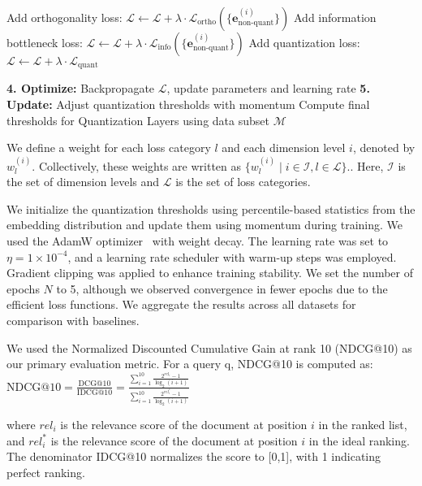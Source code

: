 \begin{algorithm}[H]
\begin{algorithmic}[1]
        \State Add orthogonality loss: $\mathcal{L} \leftarrow \mathcal{L} + \lambda \cdot \mathcal{L}_{\text{ortho}}(\{\mathbf{e}_{\text{non-quant}}^{(i)}\})$
        \State Add information bottleneck loss: $\mathcal{L} \leftarrow \mathcal{L} + \lambda \cdot \mathcal{L}_{\text{info}}(\{\mathbf{e}_{\text{non-quant}}^{(i)}\})$
        \State Add quantization loss: $\mathcal{L} \leftarrow \mathcal{L} + \lambda \cdot \mathcal{L}_{\text{quant}}$
        
        \State \textbf{4. Optimize:} Backpropagate $\mathcal{L}$, update parameters and learning rate
        \State \textbf{5. Update:} Adjust quantization thresholds with momentum
    \EndFor
\EndFor
\State Compute final thresholds for Quantization Layers using data subset
\State \Return $\mathcal{M}$
\end{algorithmic}
\end{algorithm}

We define a weight for each loss category \(l\) and each dimension level \(i\), denoted by \(w_l^{(i)}\). Collectively, these weights are written as $\{ w_l^{(i)} \mid i \in \mathcal{I}, l \in \mathcal{L} \}.$.
Here, \(\mathcal{I}\) is the set of dimension levels and \(\mathcal{L}\) is the set of loss categories.

We initialize the quantization thresholds using percentile-based statistics from the embedding distribution and update them using momentum during training.
We used the AdamW optimizer~\cite{loshchilov2017decoupled} with weight decay. The learning rate was set to $\eta = 1 \times 10^{-4}$, and a learning rate scheduler with warm-up steps was employed. Gradient clipping was applied to enhance training stability.
We set the number of epochs $N$ to 5, although we observed convergence in fewer epochs due to the efficient loss functions. We aggregate the results across all datasets for comparison with baselines.


We used the Normalized Discounted Cumulative Gain at rank 10 (NDCG@10) as our primary evaluation metric. 
For a query q, NDCG@10 is computed as:
$\text{NDCG@10} = \frac{\text{DCG@10}}{\text{IDCG@10}} = \frac{\sum_{i=1}^{10} \frac{2^{rel_i} - 1}{\log_2(i+1)}}{\sum_{i=1}^{10} \frac{2^{rel_i^*} - 1}{\log_2(i+1)}}$

where $rel_i$ is the relevance score of the document at position $i$ in the ranked list, and $rel_i^*$ is the relevance score of the document at position $i$ in the ideal ranking. The denominator IDCG@10 normalizes the score to [0,1], with 1 indicating perfect ranking.
